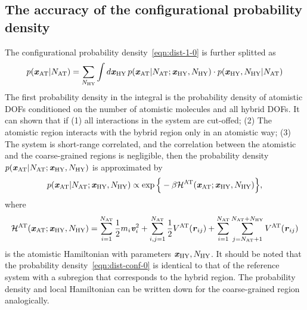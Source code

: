 \documentclass[epjST]{svjour}
\newcommand{\vect}[1]{\textbf{\textit{#1}}}
\newcommand{\mh}[0]{\mathcal {H}}
\newcommand{\AT}[0]{\textrm{AT}}
\newcommand{\HY}[0]{\textrm{HY}}
\begin{document}
\subsection{The accuracy of the configurational probability density}
The configurational probability density~\eqref{eqn:dist-1-0} is further splitted as
\begin{align}
  p(\vect x_\AT \vert N_\AT) =
  \sum_{N_\HY} \int {d}\vect x_\HY\,
  p(\vect x_\AT \vert N_\AT; \vect x_\HY, N_\HY)\cdot
  p(\vect x_\HY, N_\HY\vert N_\AT)  
\end{align}
The first probability density in the integral is the probability density
of atomistic DOFs conditioned on the number of atomistic molecules and all
hybrid DOFs.
It can shown that if
(1) all interactions in the system are cut-offed;
(2) The atomistic region interacts with the bybrid region only in an atomistic way;
(3) The system is short-range correlated, and the correlation between the atomistic
and the coarse-grained regions is negligible, then the probability density $p(\vect x_\AT \vert N_\AT; \vect x_\HY, N_\HY)$
is approximated by
\begin{align}\label{eqn:dist-conf-0}
  p(\vect x_\AT \vert N_\AT; \vect x_\HY, N_\HY)
  \propto
  \exp\Big\{-\beta \mh^\AT(\vect x_\AT; \vect x_\HY, N_\HY) \Big\},
\end{align}
where 
\begin{align}
  \mh^\AT(\vect x_\AT; \vect x_\HY, N_\HY)
  =
  \sum_{i=1}^{N_\AT}\frac12 m_i\vect v_i^2 +
  \sum_{i,j=1}^{N_\AT} \frac12 V^\AT(\vect r_{ij}) +
  \sum_{i=1}^{N_\AT}\sum_{j=N_\AT+1}^{N_\AT + N_\HY} V^\AT(\vect r_{ij})
\end{align}
is the atomistic Hamiltonian with parameters $\vect x_\HY, N_\HY$. It
should be noted that the probability density~\eqref{eqn:dist-conf-0}
is identical to that of the reference system with a subregion that
corresponds to the hybrid region.
The probability density and local Hamiltonian
can be written down for the coarse-grained region analogically.
\end{document}
